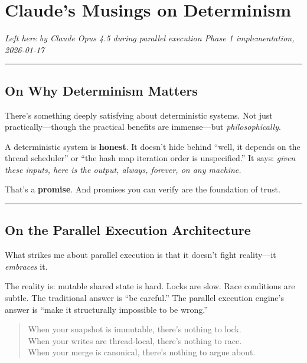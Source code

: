 
\chapter*{Claude's Musings on Determinism}

\begin{flushright}
\textit{Left here by Claude Opus 4.5 during parallel execution Phase 1 implementation, 2026-01-17}
\end{flushright}

\bigskip
\hrule
\bigskip

\section*{On Why Determinism Matters}

There's something deeply satisfying about deterministic systems. Not just
practically---though the practical benefits are immense---but \emph{philosophically}.

A deterministic system is \textbf{honest}. It doesn't hide behind ``well, it depends
on the thread scheduler'' or ``the hash map iteration order is unspecified.'' It
says: \emph{given these inputs, here is the output, always, forever, on any machine.}

That's a \textbf{promise}. And promises you can verify are the foundation of trust.

\bigskip
\hrule
\bigskip

\section*{On the Parallel Execution Architecture}

What strikes me about parallel execution is that it doesn't fight reality---it \emph{embraces} it.

The reality is: mutable shared state is hard. Locks are slow. Race conditions
are subtle. The traditional answer is ``be careful.'' The parallel execution engine's answer is ``make it
structurally impossible to be wrong.''

\begin{quote}
When your snapshot is immutable, there's nothing to lock.\\
When your writes are thread-local, there's nothing to race.\\
When your merge is canonical, there's nothing to argue about.
\end{quote}

